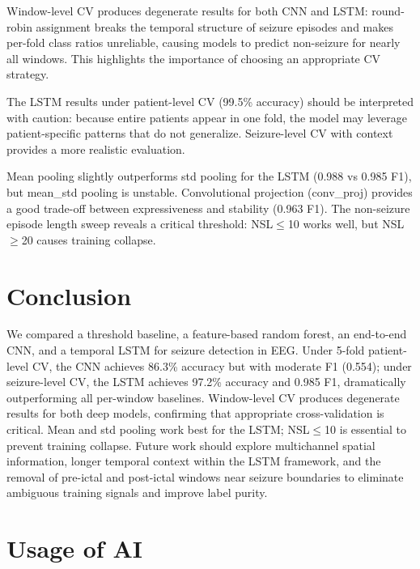 \documentclass[11pt,a4paper]{article}
\begin{document}
Window-level CV produces degenerate results for both CNN and LSTM: round-robin assignment breaks the temporal structure of seizure episodes and makes per-fold class ratios unreliable, causing models to predict non-seizure for nearly all windows.
This highlights the importance of choosing an appropriate CV strategy.

The LSTM results under patient-level CV (99.5\% accuracy) should be interpreted with caution: because entire patients appear in one fold, the model may leverage patient-specific patterns that do not generalize. Seizure-level CV with context provides a more realistic evaluation.

Mean pooling slightly outperforms std pooling for the LSTM (0.988 vs 0.985 F1), but mean\_std pooling is unstable. Convolutional projection (conv\_proj) provides a good trade-off between expressiveness and stability (0.963 F1).
The non-seizure episode length sweep reveals a critical threshold: NSL$\leq$10 works well, but NSL$\geq$20 causes training collapse.
\label{sec:discussion}


\section{Conclusion}
We compared a threshold baseline, a feature-based random forest, an end-to-end CNN, and a temporal LSTM for seizure detection in EEG.
Under 5-fold patient-level CV, the CNN achieves 86.3\% accuracy but with moderate F1 (0.554); under seizure-level CV, the LSTM achieves 97.2\% accuracy and 0.985 F1, dramatically outperforming all per-window baselines.
Window-level CV produces degenerate results for both deep models, confirming that appropriate cross-validation is critical.
Mean and std pooling work best for the LSTM; NSL$\leq$10 is essential to prevent training collapse.
Future work should explore multichannel spatial information, longer temporal context within the LSTM framework, and the removal of pre-ictal and post-ictal windows near seizure boundaries to eliminate ambiguous training signals and improve label purity.
\label{sec:conclusion}



\newpage

\section*{Usage of AI}
\end{document}
